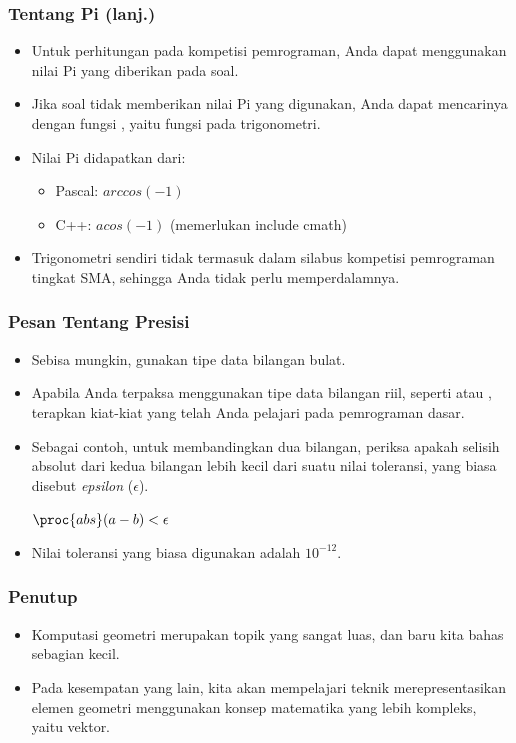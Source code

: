 \begin{frame}
\frametitle{Tentang Pi (lanj.)}
\begin{itemize}
  \item Untuk perhitungan pada kompetisi pemrograman, Anda dapat menggunakan nilai Pi yang diberikan pada soal.
  \item Jika soal tidak memberikan nilai Pi yang digunakan, Anda dapat mencarinya dengan fungsi , yaitu fungsi pada trigonometri.
  \item Nilai Pi didapatkan dari:
  \begin{itemize}
    \item Pascal: $arccos(-1)$
    \item C++: $acos(-1)$ (memerlukan include cmath)
  \end{itemize}
  \item Trigonometri sendiri tidak termasuk dalam silabus kompetisi pemrograman tingkat SMA, sehingga Anda tidak perlu memperdalamnya.
\end{itemize}
\end{frame}

\begin{frame}
\frametitle{Pesan Tentang Presisi}
\begin{itemize}
  \item Sebisa mungkin, gunakan tipe data bilangan bulat.
  \item Apabila Anda terpaksa menggunakan tipe data bilangan riil, seperti  atau , terapkan kiat-kiat yang telah Anda pelajari pada pemrograman dasar.
  \item Sebagai contoh, untuk membandingkan dua bilangan, periksa apakah selisih absolut dari kedua bilangan lebih kecil dari suatu nilai toleransi, yang biasa disebut \textit{epsilon} ($\epsilon$).
  \begin{codebox}
     \Return $\proc{abs}(a - b) < \epsilon$
  \end{codebox}
  \item Nilai toleransi yang biasa digunakan adalah $10^{-12}$.
\end{itemize}
\end{frame}

\begin{frame}
\frametitle{Penutup}
\begin{itemize}
  \item Komputasi geometri merupakan topik yang sangat luas, dan baru kita bahas sebagian kecil.
  \item Pada kesempatan yang lain, kita akan mempelajari teknik merepresentasikan elemen geometri menggunakan konsep matematika yang lebih kompleks, yaitu vektor.
\end{itemize}
\end{frame}


